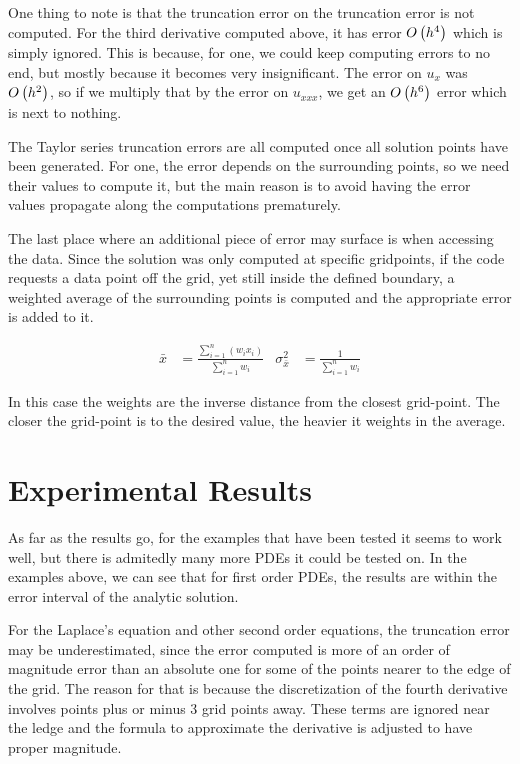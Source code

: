 One thing to note is that the truncation error on the truncation error
is not computed. For the third derivative computed above, it has error
$O\left(h^4\right)$ which is simply ignored. This is because, for one, we
could keep computing errors to no end, but mostly because it becomes
very insignificant. The error on $u_x$ was $O\left(h^2\right)$, so if we
multiply that by the error on $u_{xxx}$, we get an $O\left(h^6\right)$
error which is next to nothing.

The Taylor series truncation errors are all computed once all solution
points have been generated. For one, the error depends on the
surrounding points, so we need their values to compute it, but the
main reason is to avoid having the error values propagate along the
computations prematurely.

The last place where an additional piece of error may surface is when
accessing the data. Since the solution was only computed at specific
gridpoints, if the code requests a data point off the grid, yet still
inside the defined boundary, a weighted average of the surrounding
points is computed and the appropriate error is added to it.

\begin{align*}
    \bar{x} & = \frac{\sum_{i=1}^n(w_ix_i)}{\sum_{i=1}^n w_i}&
    \sigma^2_{\bar{x}}& = \frac{1}{\sum_{i=1}^n w_i}
\end{align*}

In this case the weights are the inverse distance from the closest
grid-point. The closer the grid-point is to the desired value, the
heavier it weights in the average.
\section{Experimental Results}
As far as the results go, for the examples that have been tested it
seems to work well, but there is admitedly many more PDEs it could be
tested on. In the examples above, we can see that for first order
PDEs, the results are within the error interval of the analytic
solution.

For
the Laplace's equation and other second order equations, the
truncation error may be underestimated, since the error computed is
more of an order of magnitude error than an absolute one for some of
the points nearer to the edge of the grid. The reason for that is
because the discretization of the fourth derivative involves points
plus or minus 3 grid points away. These terms are ignored near the
ledge and the formula to approximate the derivative is adjusted to
have proper magnitude.


